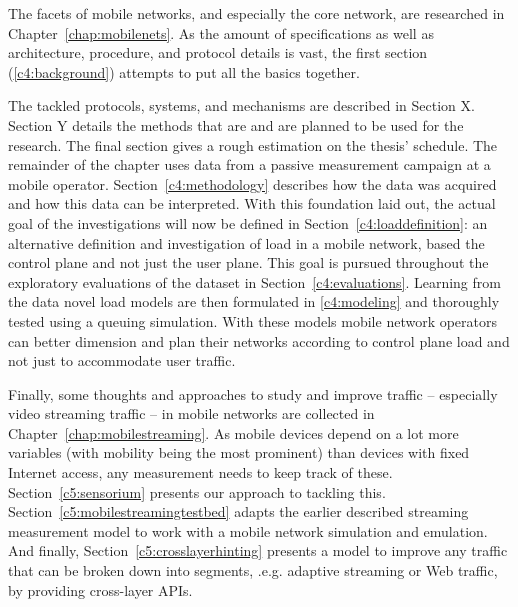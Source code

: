 The facets of mobile networks, and especially the core network, are researched in Chapter~\ref{chap:mobilenets}. As the amount of specifications as well as architecture, procedure, and protocol details is vast, the first section (\ref{c4:background}) attempts to put all the basics together. 

The tackled protocols, systems, and mechanisms are described in Section X. Section Y details the methods that are and are planned to be used for the research. The final section gives a rough estimation on the thesis' schedule. The remainder of the chapter uses data from a passive measurement campaign at a mobile operator. Section~\ref{c4:methodology} describes how the data was acquired and how this data can be interpreted. With this foundation laid out, the actual goal of the investigations will now be defined in Section~\ref{c4:loaddefinition}: an alternative definition and investigation of load in a mobile network, based the control plane and not just the user plane. This goal is pursued throughout the exploratory evaluations of the dataset in Section~\ref{c4:evaluations}. Learning from the data novel load models are then formulated in \ref{c4:modeling} and thoroughly tested using a queuing simulation. With these models mobile network operators can better dimension and plan their networks according to control plane load and not just to accommodate user traffic.


Finally, some thoughts and approaches to study and improve traffic -- especially video streaming traffic -- in mobile networks are collected in Chapter~\ref{chap:mobilestreaming}.  As mobile devices depend on a lot more variables (with mobility being the most prominent) than devices with fixed Internet access, any measurement needs to keep track of these. Section~\ref{c5:sensorium} presents our approach to tackling this.
Section~\ref{c5:mobilestreamingtestbed} adapts the earlier described streaming measurement model to work with a mobile network simulation and emulation.
And finally, Section~\ref{c5:crosslayerhinting} presents a model to improve any traffic that can be broken down into segments, .e.g. adaptive streaming or Web traffic, by providing cross-layer \glspl{API}.





